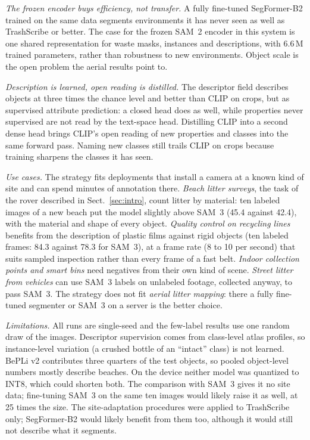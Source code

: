 \documentclass[pdflatex,sn-basic,Numbered]{sn-jnl}%
\newcommand{\trashscribe}{TrashScribe}
\begin{document}
\emph{The frozen encoder buys efficiency, not transfer.} A fully fine-tuned SegFormer-B2 trained on the same data segments environments it has never seen as well as \trashscribe{} or better. The case for the frozen SAM~2 encoder in this system is one shared representation for waste masks, instances and descriptions, with 6.6\,M trained parameters, rather than robustness to new environments. Object scale is the open problem the aerial results point to.

\emph{Description is learned, open reading is distilled.} The descriptor field describes objects at three times the chance level and better than CLIP on crops, but as supervised attribute prediction: a closed head does as well, while properties never supervised are not read by the text-space head. Distilling CLIP into a second dense head brings CLIP's open reading of new properties and classes into the same forward pass. Naming new classes still trails CLIP on crops because training sharpens the classes it has seen.

\emph{Use cases.} The strategy fits deployments that install a camera at a known kind of site and can spend minutes of annotation there. \emph{Beach litter surveys}, the task of the rover described in Sect.~\ref{sec:intro}, count litter by material: ten labeled images of a new beach put the model slightly above SAM~3 (45.4 against 42.4), with the material and shape of every object. \emph{Quality control on recycling lines} benefits from the description of plastic films against rigid objects (ten labeled frames: 84.3 against 78.3 for SAM~3), at a frame rate (8 to 10 per second) that suits sampled inspection rather than every frame of a fast belt. \emph{Indoor collection points and smart bins} need negatives from their own kind of scene. \emph{Street litter from vehicles} can use SAM~3 labels on unlabeled footage, collected anyway, to pass SAM~3. The strategy does not fit \emph{aerial litter mapping}: there a fully fine-tuned segmenter or SAM~3 on a server is the better choice.

\emph{Limitations.} All runs are single-seed and the few-label results use one random draw of the images. Descriptor supervision comes from class-level atlas profiles, so instance-level variation (a crushed bottle of an ``intact'' class) is not learned. BePLi v2 contributes three quarters of the test objects, so pooled object-level numbers mostly describe beaches. On the device neither model was quantized to INT8, which could shorten both. The comparison with SAM~3 gives it no site data; fine-tuning SAM~3 on the same ten images would likely raise it as well, at 25 times the size. The site-adaptation procedures were applied to \trashscribe{} only; SegFormer-B2 would likely benefit from them too, although it would still not describe what it segments.
\end{document}
